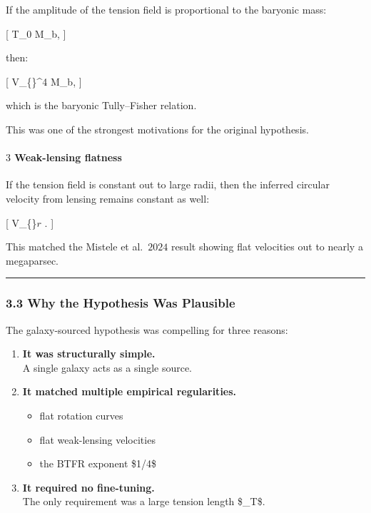 If the amplitude of the tension field is proportional to the baryonic
mass:

{[} T\_0 \propto M\_b,  {]}

then:

{[} V\_\{\}\^{}4 \propto M\_b,  {]}

which is the baryonic Tully--Fisher relation.

This was one of the strongest motivations for the original hypothesis.

\paragraph{\texorpdfstring{\textbf{\(3\) Weak-lensing
flatness}}{3 Weak-lensing flatness}}\label{weak-lensing-flatness}

If the tension field is constant out to large radii, then the inferred
circular velocity from lensing remains constant as well:

{[} V\_\{\}\(r\) \approx {}.  {]}

This matched the Mistele et al.~\(2024\) result showing flat velocities
out to nearly a megaparsec.

\begin{center}\rule{0.5\linewidth}{0.5pt}\end{center}

\subsubsection{3.3 Why the Hypothesis Was
Plausible}\label{why-the-hypothesis-was-plausible}

The galaxy-sourced hypothesis was compelling for three reasons:

\begin{enumerate}
\def\labelenumi{\arabic{enumi}.}
\item
  \textbf{It was structurally simple.}\\
  A single galaxy acts as a single source.
\item
  \textbf{It matched multiple empirical regularities.}

  \begin{itemize}
  \tightlist
  \item
    flat rotation curves\\
  \item
    flat weak-lensing velocities\\
  \item
    the BTFR exponent \$1/4\$
  \end{itemize}
\item
  \textbf{It required no fine-tuning.}\\
  The only requirement was a large tension length \$\ell\_T\$.
\end{enumerate}

